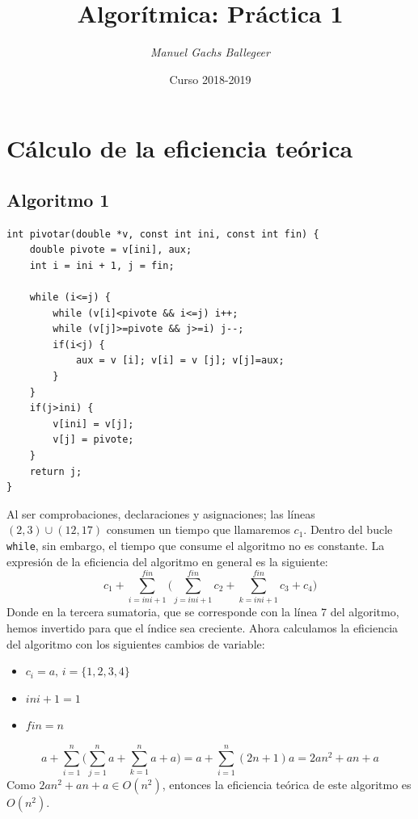 \documentclass[11pt,twoside,titlepage,a4paper]{article}
\begin{document}
\title{\Huge{\textbf{Algorítmica: Práctica 1}}}
\author{\textit{Manuel Gachs Ballegeer}}
\date{Curso 2018-2019}
\maketitle

\tableofcontents
\clearpage
\section{Cálculo de la eficiencia teórica}

\subsection{Algoritmo 1}

\begin{lstlisting}
int pivotar(double *v, const int ini, const int fin) {
	double pivote = v[ini], aux;
	int i = ini + 1, j = fin;
	
	while (i<=j) {
		while (v[i]<pivote && i<=j) i++;
		while (v[j]>=pivote && j>=i) j--;
		if(i<j) {
			aux = v [i]; v[i] = v [j]; v[j]=aux;
		}
	}
	if(j>ini) {
		v[ini] = v[j];
		v[j] = pivote;
	}
	return j;
}
\end{lstlisting}
Al ser comprobaciones, declaraciones y asignaciones; las líneas $(2,3)\cup(12,17)$ consumen un tiempo que 
llamaremos $c_1$. Dentro del bucle \texttt{while}, sin embargo, el tiempo que consume el algoritmo no es 
constante. La expresión de la eficiencia del algoritmo en general es la siguiente:
\begin{equation*}
c_1+\sum_{i=ini+1}^{fin}\Big(\sum_{j=ini+1}^{fin}c_2+\sum_{k=ini+1}^{fin}c_3+c_4\Big)
\end{equation*}
Donde en la tercera sumatoria, que se corresponde con la línea 7 del algoritmo, hemos invertido para que el
índice sea creciente. Ahora calculamos la eficiencia del algoritmo con los siguientes cambios de variable:
\begin{itemize}[noitemsep]
\item $c_i=a,\, i=\{1,2,3,4\}$
\item $ini+1=1$
\item $fin=n$
\end{itemize}
\begin{equation*}
a + \sum_{i=1}^n \Big(\sum_{j=1}^n a + \sum_{k=1}^n a + a\Big) = a + \sum_{i=1}^n (2n+1)a = 2an^2 + an + a
\end{equation*}
Como $2an^2 + an + a \in O(n^2)$, entonces la eficiencia teórica de este algoritmo es $O(n^2)$.
\clearpage
\end{document}
